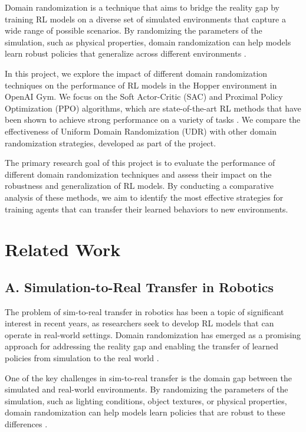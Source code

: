 \documentclass[12pt]{article}
\begin{document}
Domain randomization is a technique that aims to bridge the reality gap by training RL models on a diverse set of simulated environments that capture a wide range of possible scenarios. By randomizing the parameters of the simulation, such as physical properties, domain randomization can help models learn robust policies that generalize across different environments \cite{Tobin2017, Peng2018}.

In this project, we explore the impact of different domain randomization techniques on the performance of RL models in the Hopper environment in OpenAI Gym. We focus on the Soft Actor-Critic (SAC) and Proximal Policy Optimization (PPO) algorithms, which are state-of-the-art RL methods that have been shown to achieve strong performance on a variety of tasks \cite{Haarnoja2018, Schulman2017}. We compare the effectiveness of Uniform Domain Randomization (UDR) with other domain randomization strategies, developed as part of the project. 

The primary research goal of this project is to evaluate the performance of different domain randomization techniques and assess their impact on the robustness and generalization of RL models. By conducting a comparative analysis of these methods, we aim to identify the most effective strategies for training agents that can transfer their learned behaviors to new environments.

\section{Related Work}

\subsection{A. Simulation-to-Real Transfer in Robotics}

The problem of sim-to-real transfer in robotics has been a topic of significant interest in recent years, as researchers seek to develop RL models that can operate in real-world settings. Domain randomization has emerged as a promising approach for addressing the reality gap and enabling the transfer of learned policies from simulation to the real world \cite{Peng2018}.

One of the key challenges in sim-to-real transfer is the domain gap between the simulated and real-world environments. By randomizing the parameters of the simulation, such as lighting conditions, object textures, or physical properties, domain randomization can help models learn policies that are robust to these differences \cite{Tobin2017}.
\end{document}
